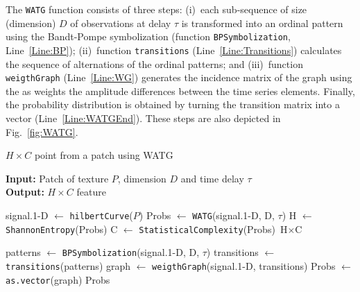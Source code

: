 The \texttt{WATG} function consists of three steps: 
(i)~each sub-sequence of size (dimension) $D$ of observations at delay $\tau$ is transformed into an ordinal pattern using the Bandt-Pompe symbolization (function \texttt{BPSymbolization}, Line~\ref{Line:BP}); 
(ii)~function \texttt{transitions} (Line~\ref{Line:Transitions}) calculates the sequence of alternations of the ordinal patterns; and 
(iii)~function \texttt{weigthGraph} (Line~\ref{Line:WG}) generates the incidence matrix of the graph using the as weights the amplitude differences between the time series elements.
Finally, the probability distribution is obtained by turning the transition matrix into a vector (Line~\ref{Line:WATGEnd}).
These steps are also depicted in Fig.~\ref{fig:WATG}.

\begin{algorithm}
	\caption{$H \times C$ point from a patch using WATG}
	\label{alg:watg}                                
	\textbf{Input:} Patch of texture $P$, dimension $D$ and time delay \textbf{$\tau$}\\
	\textbf{Output:} $H \times C$ feature
	\begin{algorithmic}[1]
		\State signal.\mbox{1-D} $\gets$ \texttt{hilbertCurve}($P$) \label{Line:Peano}
		\State Probs $\gets$ \texttt{WATG}(signal.\mbox{1-D}, D, $\tau$) \label{Line:Probs}
		\State H $\gets$ \texttt{ShannonEntropy}(Probs) \label{Line:Shannon}
		\State C $\gets$ \texttt{StatisticalComplexity}(Probs) \label{Line:StatisticalComplexity}
		\State \Return $\text{H}\times\text{C}$
		
		\vspace{0.15cm}
		
		\State patterns $\gets$ \label{Line:WATGBegin} \texttt{BPSymbolization}(signal.\mbox{1-D}, D, $\tau$) \label{Line:BP}
		\State transitions $\gets$ \texttt{transitions}(patterns) \label{Line:Transitions}
		\State graph $\gets$ \texttt{weigthGraph}(signal.\mbox{1-D}, transitions) \label{Line:WG}
		\State Probs $\gets$ \texttt{as.vector}(graph) \label{Line:WATGEnd}
		\State \Return Probs
		\EndFunction
	\end{algorithmic}
\end{algorithm}

